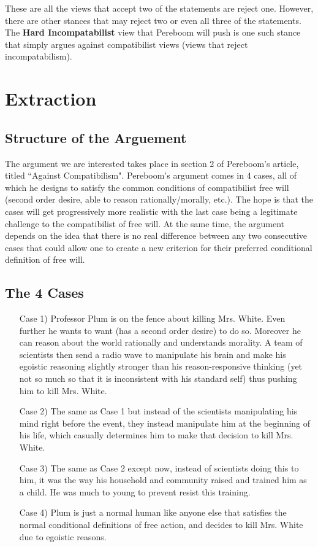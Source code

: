 \documentclass{article}
\begin{document}
These are all the views that accept two of the statements are reject one. However, there are other stances that may reject two or even all three of the statements. The \textbf{Hard Incompatabilist} view that Pereboom will push is one such stance that simply argues against compatibilist views (views that reject incompatabilism).

\section{Extraction}
\subsection{Structure of the Arguement}
The argument we are interested takes place in section 2 of Pereboom's article, titled ``Against Compatibilism". Pereboom's argument comes in 4 cases, all of which he designs to satisfy the common conditions of compatibilist free will (second order desire, able to reason rationally/morally, etc.). The hope is that the cases will get progressively more realistic with the last case being a legitimate challenge to the compatibilist of free will. At the same time, the argument depends on the idea that there is no real difference between any two consecutive cases that could allow one to create a new criterion for their preferred conditional definition of free will.

\subsection{The 4 Cases}
\begin{enumerate}
    \item[Case 1)] Professor Plum is on the fence about killing Mrs. White. Even further he wants to want (has a second order desire) to do so. Moreover he can reason about the world rationally and understands morality. A team of scientists then send a radio wave to manipulate his brain and make his egoistic reasoning slightly stronger than his reason-responsive thinking (yet not so much so that it is inconsistent with his standard self) thus pushing him to kill Mrs. White.
    \item[Case 2)] The same as Case 1 but instead of the scientists manipulating his mind right before the event, they instead manipulate him  at the beginning of his life, which casually determines him to make that decision to kill Mrs. White.
    \item[Case 3)] The same as Case 2 except now, instead of scientists doing this to him, it was the way his household and community raised and trained him as a child. He was much to young to prevent resist this training.
    \item[Case 4)] Plum is just a normal human like anyone else that satisfies the normal conditional definitions of free action, and decides to kill Mrs. White due to egoistic reasons.
\end{enumerate}
\end{document}
